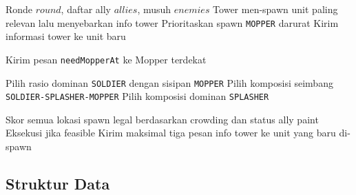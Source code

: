 \begin{breakablealgorithm}
	\caption{Greedy Phase-Based Spawn dan Relay pada TowerBot Main Bot}
	\label{alg:mainbot-tower-spawn}
	\begin{algorithmic}[1]
		\Require Ronde $round$, daftar ally $allies$, musuh $enemies$
		\Ensure Tower men-spawn unit paling relevan lalu menyebarkan info tower
		\State Prioritaskan spawn \texttt{MOPPER} darurat
		\State Kirim informasi tower ke unit baru
		\State \Return
		\EndIf

		\State Kirim pesan \texttt{needMopperAt} ke Mopper terdekat
		\EndIf

		\State Pilih rasio dominan \texttt{SOLDIER} dengan sisipan \texttt{MOPPER}
		\State Pilih komposisi seimbang \texttt{SOLDIER-SPLASHER-MOPPER}
		\Else
		\State Pilih komposisi dominan \texttt{SPLASHER}
		\EndIf

		\State Skor semua lokasi spawn legal berdasarkan crowding dan status ally paint
		\State Eksekusi  jika feasible
		\State Kirim maksimal tiga pesan info tower ke unit yang baru di-spawn
		\EndFunction
	\end{algorithmic}
\end{breakablealgorithm}

\newpage
\subsection{Struktur Data}

